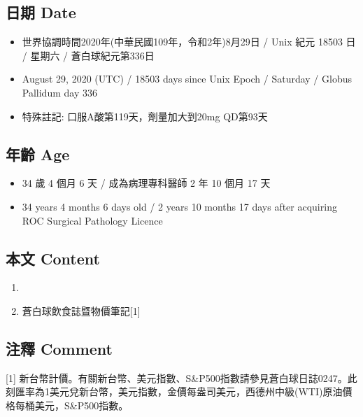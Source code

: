 \documentclass[a5paper, 11pt
]{book}
\providecommand{\tightlist}{%
  \setlength{\itemsep}{0pt}\setlength{\parskip}{0pt}}
\begin{document}
\hypertarget{ux65e5ux671f-date-89}{%
\subsection{日期 Date}\label{ux65e5ux671f-date-89}}

\begin{itemize}
\tightlist
\item
  世界協調時間2020年(中華民國109年，令和2年)8月29日 / Unix 紀元 18503 日
  / 星期六 / 蒼白球紀元第336日
\item
  August 29, 2020 (UTC) / 18503 days since Unix Epoch / Saturday /
  Globus Pallidum day 336
\item
  特殊註記: 口服A酸第119天，劑量加大到20mg QD第93天
\end{itemize}

\hypertarget{ux5e74ux9f61-age-89}{%
\subsection{年齡 Age}\label{ux5e74ux9f61-age-89}}

\begin{itemize}
\tightlist
\item
  34 歲 4 個月 6 天 / 成為病理專科醫師 2 年 10 個月 17 天
\item
  34 years 4 months 6 days old / 2 years 10 months 17 days after
  acquiring ROC Surgical Pathology Licence
\end{itemize}

\hypertarget{ux672cux6587-content-89}{%
\subsection{本文 Content}\label{ux672cux6587-content-89}}

\begin{enumerate}
\def\labelenumi{\arabic{enumi}.}
\tightlist
\item
\item
  蒼白球飲食誌暨物價筆記{[}1{]}
\end{enumerate}

\hypertarget{ux6ce8ux91cb-comment-89}{%
\subsection{注釋 Comment}\label{ux6ce8ux91cb-comment-89}}

{[}1{]}
新台幣計價。有關新台幣、美元指數、S\&P500指數請參見蒼白球日誌0247。此刻匯率為1美元兌新台幣，美元指數，金價每盎司美元，西德州中級(WTI)原油價格每桶美元，S\&P500指數。
\end{document}
